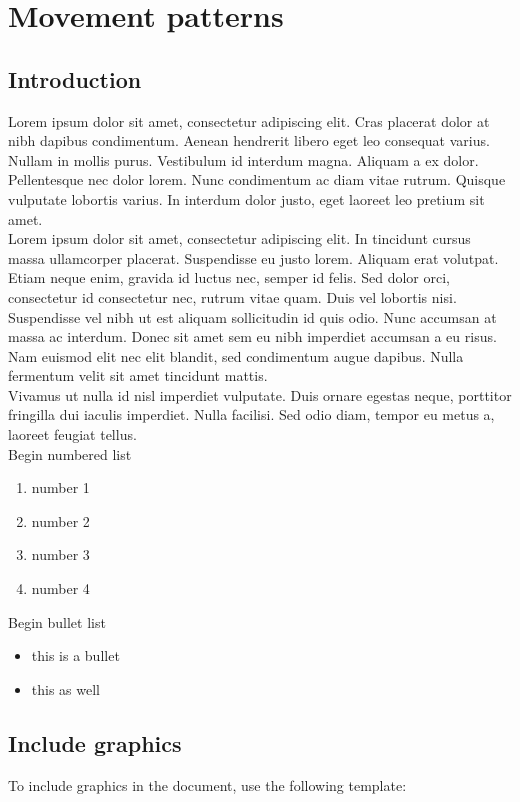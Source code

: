 \chapter{Movement patterns}\label{movementpatterns} 
\section{Introduction}\label{intro}
Lorem ipsum dolor sit amet, consectetur adipiscing elit. Cras placerat dolor at nibh dapibus condimentum. Aenean hendrerit libero eget leo consequat varius. Nullam in mollis purus. Vestibulum id interdum magna. Aliquam a ex dolor. Pellentesque nec dolor lorem. Nunc condimentum ac diam vitae rutrum. Quisque vulputate lobortis varius. In interdum dolor justo, eget laoreet leo pretium sit amet. \\ %
Lorem ipsum dolor sit amet, consectetur adipiscing elit. In tincidunt cursus massa ullamcorper placerat. Suspendisse eu justo lorem. Aliquam erat volutpat. Etiam neque enim, gravida id luctus nec, semper id felis. Sed dolor orci, consectetur id consectetur nec, rutrum vitae quam. Duis vel lobortis nisi. Suspendisse vel nibh ut est aliquam sollicitudin id quis odio. Nunc accumsan at massa ac interdum. Donec sit amet sem eu nibh imperdiet accumsan a eu risus. Nam euismod elit nec elit blandit, sed condimentum augue dapibus. Nulla fermentum velit sit amet tincidunt mattis. \\
Vivamus ut nulla id nisl imperdiet vulputate. Duis ornare egestas neque, porttitor fringilla dui iaculis imperdiet. Nulla facilisi. Sed odio diam, tempor eu metus a, laoreet feugiat tellus.\\
Begin numbered list
\begin{enumerate}
\item number 1
\item number 2
\item number 3
\item number 4
\end{enumerate}
Begin bullet list
\begin{itemize}
\item this is a bullet
\item this as well
\end{itemize}


\section{Include graphics}
To include graphics in the document, use the following template:

